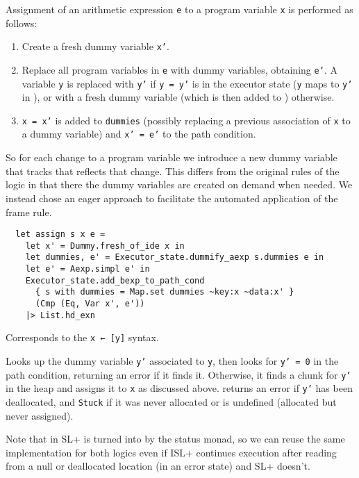 \documentclass[parskip=half]{scrartcl}
\begin{document}
Assignment of an arithmetic expression \texttt{e} to a program variable \texttt{x} is performed as follows:
\begin{enumerate}
\item Create a fresh dummy variable \texttt{x'}.
\item Replace all program variables in \texttt{e} with dummy variables, obtaining \texttt{e'}. A variable \texttt{y} is replaced with \texttt{y'} if \texttt{y = y'} is in the executor state (\ie \texttt{y} maps to \texttt{y'} in ), or with a fresh dummy variable (which is then added to ) otherwise.
\item \texttt{x = x'} is added to \texttt{dummies} (possibly replacing a previous association of \texttt{x} to a dummy variable) and \texttt{x' = e'} to the path condition.
\end{enumerate}

So for each change to a program variable we introduce a new dummy variable that tracks that reflects that change. This differs from the original rules of the logic in that there the dummy variables are created on demand when needed. We instead chose an eager approach to facilitate the automated application of the frame rule.

\begin{verbatim}
  let assign s x e =
    let x' = Dummy.fresh_of_ide x in
    let dummies, e' = Executor_state.dummify_aexp s.dummies e in
    let e' = Aexp.simpl e' in
    Executor_state.add_bexp_to_path_cond
      { s with dummies = Map.set dummies ~key:x ~data:x' }
      (Cmp (Eq, Var x', e'))
    |> List.hd_exn
\end{verbatim}


Corresponds to the \texttt{x ← [y]} syntax.

Looks up the dummy variable \texttt{y'} associated to \texttt{y}, then looks for \texttt{y' = 0} in the path condition, returning an error if it finds it. Otherwise, it finds a chunk for \texttt{y'} in the heap and assigns it to \texttt{x} as discussed above.  returns an error if \texttt{y'} has been deallocated, and \texttt{Stuck} if it was never allocated or is undefined (allocated but never assigned).

Note that in SL+  is turned into  by the status monad, so we can reuse the same implementation for both logics even if ISL+ continues execution after reading from a null or deallocated location (in an error state) and SL+ doesn't.
\end{document}
